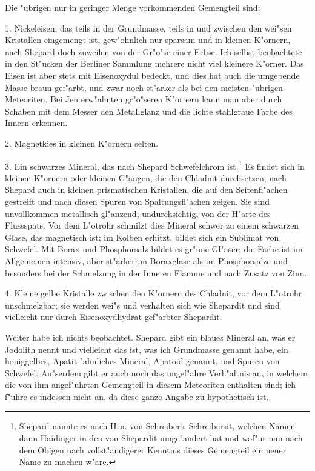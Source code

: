 \documentclass[a4paper, 11pt, oneside, german]{article}
\begin{document}
Die "ubrigen nur in geringer Menge vorkommenden Gemengteil sind:

1. Nickeleisen, das teils in der Grundmasse, teils in und zwischen den wei"sen Kristallen eingemengt ist, gew"ohnlich nur sparsam und in kleinen K"ornern, nach Shepard doch zuweilen von der Gr"o"se einer Erbse. Ich selbst beobachtete in den St"ucken der Berliner Sammlung mehrere nicht viel kleinere K"orner. Das Eisen ist aber stets mit Eisenoxydul bedeckt, und dies hat auch die umgebende Masse braun gef"arbt, und zwar noch st"arker als bei den meisten "ubrigen Meteoriten. Bei Jen erw"ahnten gr"o"seren K"ornern kann man aber durch Schaben mit dem Messer den Metallglanz und die lichte stahlgraue Farbe des Innern erkennen.

2. Magnetkies in kleinen K"ornern selten.

3. Ein schwarzes Mineral, das nach Shepard Schwefelchrom ist.\footnote{Shepard nannte es nach Hrn. von Schreibers: Schreibersit, welchen Namen dann Haidinger in den von Shepardit umge"andert hat und wof"ur nun nach dem Obigen nach vollst"andigerer Kenntnis dieses Gemengteil ein neuer Name zu machen w"are.} Es findet sich in kleinen K"ornern oder kleinen G"angen, die den Chladnit durchsetzen, nach Shepard auch in kleinen prismatischen Kristallen, die auf den Seitenfl"achen gestreift und nach diesen Spuren von Spaltungsfl"achen zeigen. Sie sind unvollkommen metallisch gl"anzend, undurchsichtig, von der H"arte des Flussspats. Vor dem L"otrohr schmilzt dies Mineral schwer zu einem schwarzen Glase, das magnetisch ist; im Kolben erhitzt, bildet sich ein Sublimat von Schwefel. Mit Borax und Phosphorsalz bildet es gr"une Gl"aser; die Farbe ist im Allgemeinen intensiv, aber st"arker im Boraxglase als im Phosphorsalze und besonders bei der Schmelzung in der Inneren Flamme und nach Zusatz von Zinn.

4. Kleine gelbe Kristalle zwischen den K"ornern des Chladnit, vor dem L"otrohr unschmelzbar; sie werden wei"s und verhalten sich wie Shepardit und sind vielleicht nur durch Eisenoxydhydrat gef"arbter Shepardit.

Weiter habe ich nichts beobachtet. Shepard gibt ein blaues Mineral an, was er Jodolith nennt und vielleicht das ist, was ich Grundmasse genannt habe, ein honiggelbes, Apatit "ahnliches Mineral, Apatoid genannt, und Spuren von Schwefel. Au"serdem gibt er auch noch das ungef"ahre Verh"altnis an, in welchem die von ihm angef"uhrten Gemengteil in diesem Meteoriten enthalten sind; ich f"uhre es indessen nicht an, da diese ganze Angabe zu hypothetisch ist.
\end{document}

